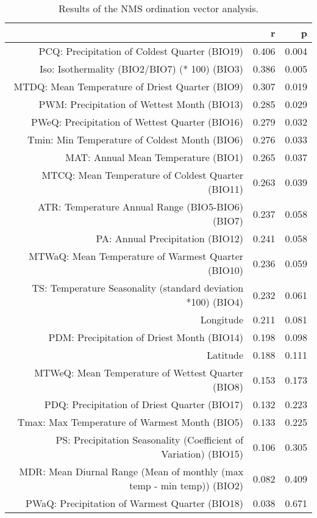 \begin{table}[ht]
\centering
\begin{tabular}{rrr}
  \hline
 & r & p \\ 
  \hline
PCQ: Precipitation of Coldest Quarter (BIO19) & 0.406 & 0.004 \\ 
  Iso: Isothermality (BIO2/BIO7) (* 100) (BIO3) & 0.386 & 0.005 \\ 
  MTDQ: Mean Temperature of Driest Quarter (BIO9) & 0.307 & 0.019 \\ 
  PWM: Precipitation of Wettest Month (BIO13) & 0.285 & 0.029 \\ 
  PWeQ: Precipitation of Wettest Quarter (BIO16) & 0.279 & 0.032 \\ 
  Tmin: Min Temperature of Coldest Month (BIO6) & 0.276 & 0.033 \\ 
  MAT: Annual Mean Temperature (BIO1) & 0.265 & 0.037 \\ 
  MTCQ: Mean Temperature of Coldest Quarter (BIO11) & 0.263 & 0.039 \\ 
  ATR: Temperature Annual Range (BIO5-BIO6) (BIO7) & 0.237 & 0.058 \\ 
  PA: Annual Precipitation (BIO12) & 0.241 & 0.058 \\ 
  MTWaQ: Mean Temperature of Warmest Quarter (BIO10) & 0.236 & 0.059 \\ 
  TS: Temperature Seasonality (standard deviation *100) (BIO4) & 0.232 & 0.061 \\ 
  Longitude & 0.211 & 0.081 \\ 
  PDM: Precipitation of Driest Month (BIO14) & 0.198 & 0.098 \\ 
  Latitude & 0.188 & 0.111 \\ 
  MTWeQ: Mean Temperature of Wettest Quarter (BIO8) & 0.153 & 0.173 \\ 
  PDQ: Precipitation of Driest Quarter (BIO17) & 0.132 & 0.223 \\ 
  Tmax: Max Temperature of Warmest Month (BIO5) & 0.133 & 0.225 \\ 
  PS: Precipitation Seasonality (Coefficient of Variation) (BIO15) & 0.106 & 0.305 \\ 
  MDR: Mean Diurnal Range (Mean of monthly (max temp - min temp)) (BIO2) & 0.082 & 0.409 \\ 
  PWaQ: Precipitation of Warmest Quarter (BIO18) & 0.038 & 0.671 \\ 
   \hline
\end{tabular}
\caption{Results of the NMS ordination vector analysis.} 
\label{tab:wc_vec}
\end{table}
